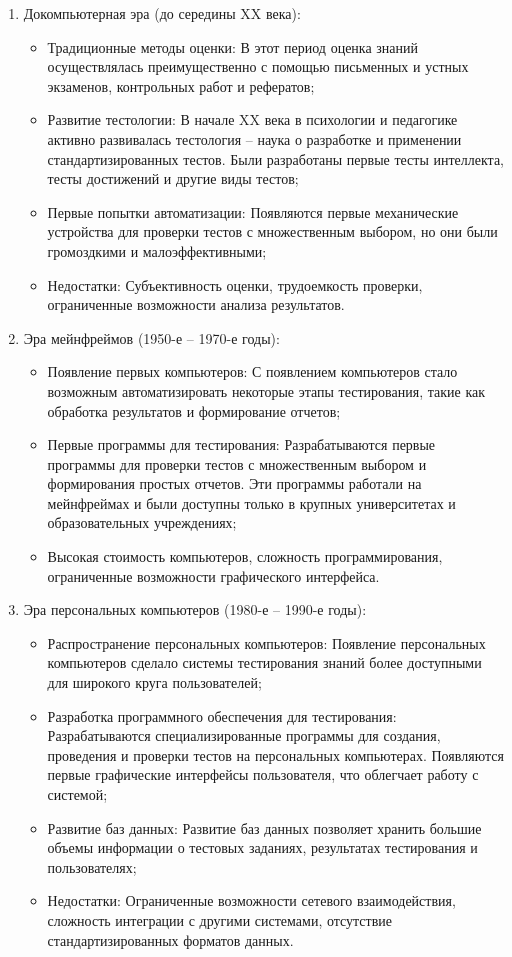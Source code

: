 \begin{enumerate}
	
	\item Докомпьютерная эра (до середины XX века):
	\begin{itemize}
		\item Традиционные методы оценки: В этот период оценка знаний осуществлялась преимущественно с помощью письменных и устных экзаменов, контрольных работ и рефератов;
		\item Развитие тестологии: В начале XX века в психологии и педагогике активно развивалась тестология – наука о разработке и применении стандартизированных тестов. Были разработаны первые тесты интеллекта, тесты достижений и другие виды тестов;
		\item Первые попытки автоматизации: Появляются первые механические устройства для проверки тестов с множественным выбором, но они были громоздкими и малоэффективными;
		\item Недостатки: Субъективность оценки, трудоемкость проверки, ограниченные возможности анализа результатов.
	\end{itemize}
	
	\item Эра мейнфреймов (1950-е – 1970-е годы):
	\begin{itemize}
		\item Появление первых компьютеров: С появлением компьютеров стало возможным автоматизировать некоторые этапы тестирования, такие как обработка результатов и формирование отчетов;
		\item Первые программы для тестирования: Разрабатываются первые программы для проверки тестов с множественным выбором и формирования простых отчетов. Эти программы работали на мейнфреймах и были доступны только в крупных университетах и образовательных учреждениях;
		\item Высокая стоимость компьютеров, сложность программирования, ограниченные возможности графического интерфейса.
	\end{itemize}
	
	\item Эра персональных компьютеров (1980-е – 1990-е годы):
	\begin{itemize}
		\item Распространение персональных компьютеров: Появление персональных компьютеров сделало системы тестирования знаний более доступными для широкого круга пользователей;
		\item Разработка программного обеспечения для тестирования: Разрабатываются специализированные программы для создания, проведения и проверки тестов на персональных компьютерах. Появляются первые графические интерфейсы пользователя, что облегчает работу с системой;
		\item Развитие баз данных: Развитие баз данных позволяет хранить большие объемы информации о тестовых заданиях, результатах тестирования и пользователях;
		\item Недостатки: Ограниченные возможности сетевого взаимодействия, сложность интеграции с другими системами, отсутствие стандартизированных форматов данных.
	\end{itemize}
	

\end{enumerate}
